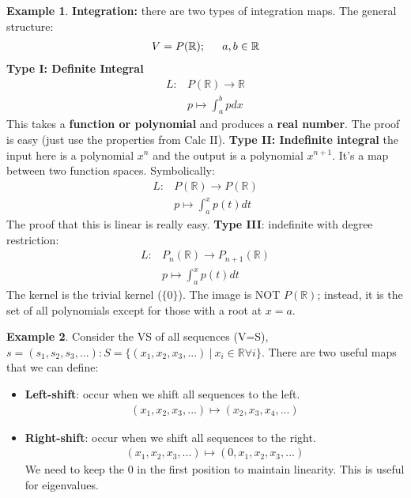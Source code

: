 \documentclass[a4paper, 12pt]{article}
\theoremstyle{definition}
\newtheorem{exmp}{Example}[section]
\theoremstyle{definition}
\theoremstyle{definition}
\theoremstyle{definition}
\begin{document}
{\begin{exmp}
	\textbf{Integration:} there are two types of integration maps. The general structure: 
	\begin{align*}
		V = P (\mathbb{R}); \indent a,b \in \mathbb{R} 
	\end{align*}
	\textbf{Type I: Definite Integral} \\
	\begin{align*}
		L: & P(\mathbb{R}) \rightarrow \mathbb{R} \\
			& p \mapsto \int_a^b p dx 
	\end{align*}
	This takes a \textbf{function or polynomial} and produces a \textbf{real number}. The proof is easy (just use the properties from Calc II). 
	\newline 
	\newline 
	\textbf{Type II: Indefinite integral} the input here is a polynomial $x^n$ and the output is a polynomial $x^{n+1}$. It's a map between two function spaces. Symbolically: 
	\begin{align*}
		L: & P(\mathbb{R}) \rightarrow P(\mathbb{R}) \\ 
		   & p \mapsto \int_a^x p(t) dt 
	\end{align*}
	The proof that this is linear is really easy. 
	\newline
	\newline
	\textbf{Type III}: indefinite with degree restriction: 
	\begin{align*}
		L: & P_n(\mathbb{R}) \rightarrow P_{n+1} (\mathbb{R}) \\ 
		   & p \mapsto \int_a^x p(t)dt 
	\end{align*}
	The kernel is the trivial kernel ($\{ 0 \}$). The image is NOT $P(\mathbb{R})$; instead, it is the set of all polynomials except for those with a root at $x=a$. 
\end{exmp}

\begin{exmp}
	Consider the VS of all sequences (V=S), $s=(s_1,s_2,s_3,...): S = \{ (x_1,x_2,x_3,...)\ |\ x_i \in \mathbb{R} \forall i \}$. There are two useful maps that we can define: 
	\begin{itemize}
		\item \textbf{Left-shift}: occur when we shift all sequences to the left. 
		\begin{align*}
			(x_1, x_2, x_3, ...) \mapsto (x_2, x_3, x_4,...) 
		\end{align*}
		\item \textbf{Right-shift}: occur when we shift all sequences to the right. 
		\begin{align*}
			(x_1, x_2, x_3,...) \mapsto (0, x_1, x_2, x_3,...) 
		\end{align*}
		We need to keep the 0 in the first position to maintain linearity. This is useful for eigenvalues. 
	\end{itemize} 
\end{exmp}

}
\end{document}

